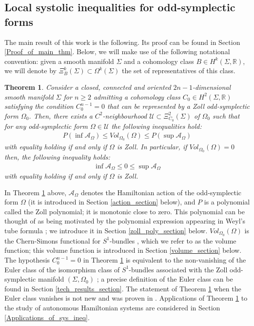 \documentclass[11pt]{amsart}
\theoremstyle{plain}
\newtheorem{theorem}{Theorem}[section]
\theoremstyle{definition}
\theoremstyle{remark}
\begin{document}
\subsection{Local systolic inequalities for odd-symplectic forms}
The main result of this work is the following. Its proof can be found in Section \ref{Proof_of_main_thm}. Below, we will make use of the following notational convention: given a smooth manifold $\Sigma$ and a cohomology class $B \in H^k(\Sigma,\mathbb{R})$, we will denote by $\Xi^k_{B}(\Sigma) \subset \Omega^k(\Sigma)$ the set of representatives of this class.
\begin{theorem}\label{systolic_ineq}
Consider a closed, connected and oriented $2n-1$-dimensional smooth manifold $\Sigma$ for $n\geq 2$ admitting a cohomology class $C_0 \in H^2(\Sigma,\mathbb{R})$ satisfying the condition $C_0^{n-1} =0$ that can be represented by a Zoll odd-symplectic form $\Omega_0$. Then, there exists a $C^2$-neighbourhood $\mathcal{U} \subset \Xi^2_{C_0}(\Sigma)$ of $\Omega_0$ such that for any odd-symplectic form $\Omega \in \mathcal{U}$ the following inequalities hold:
\begin{align}\label{systolic_ineq_eqn}
    P(\inf \mathcal{A}_{\Omega}) \leq Vol_{\Omega_0}(\Omega) \leq  P(\sup \mathcal{A}_{\Omega})
\end{align}
with equality holding if and only if $\Omega$ is Zoll. In particular, if $Vol_{\Omega_0}(\Omega) = 0$ then, the following inequality holds:
\begin{align}\label{sys_ineq_second_eqn}
    \inf \mathcal{A}_{\Omega} \leq 0 \leq \sup \mathcal{A}_{\Omega}
\end{align}
with equality holding if and only if $\Omega$ is Zoll.
\end{theorem}
In Theorem \ref{systolic_ineq} above, $\mathcal{A}_{\Omega}$ denotes the Hamiltonian action of the odd-symplectic form $\Omega$ (it is introduced in Section \ref{action_section} below), and $P$ is a polynomial called the Zoll polynomial; it is monotonic close to zero. This polynomial can be thought of as being motivated by the polynomial expression appearing in Weyl's tube formula \cite{weyl}; we introduce it in Section \ref{zoll_poly_section} below. $Vol_{\Omega_0}(\Omega)$ is the Chern-Simons functional for $S^1$-bundles \cite[Remark 2.1]{B-K-Odd_Symp}, which we refer to as the volume function; this volume function is introduced in Section \ref{volume_section} below. The hypothesis $C^{n-1}_0 =0$ in Theorem \ref{systolic_ineq} is equivalent to the non-vanishing of the Euler class of the isomorphism class of $S^1$-bundles associated with the Zoll odd-symplectic manifold $(\Sigma,\Omega_0)$ \cite[Lemma 4.5]{B-K-Odd_Symp}; a precise definition of the Euler class can be found in Section \ref{tech_results_section}. The statement of Theorem \ref{systolic_ineq} when the Euler class vanishes is not new and was proven in \cite{B-K-Odd_Symp}. Applications of Theorem \ref{systolic_ineq} to the study of autonomous Hamiltonian systems are considered in Section \ref{Applications_of_sys_ineq}.\\
\end{document}
